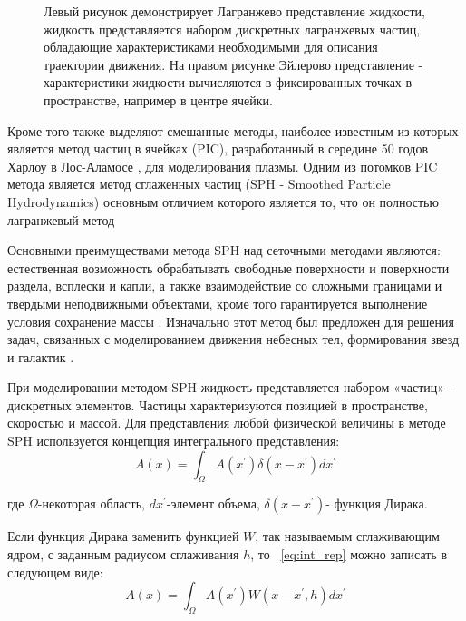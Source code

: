 \begin{figure}[ht]
  \caption{Левый рисунок демонстрирует Лагранжево представление жидкости, жидкость представляется набором дискретных лагранжевых частиц, обладающие характеристиками необходимыми для описания траектории движения. На правом рисунке Эйлерово представление - характеристики жидкости вычисляются в фиксированных точках в пространстве, например в центре ячейки.}\label{fig:sim_class}
\end{figure}

Кроме того также выделяют смешанные методы, наиболее известным из которых является метод частиц в ячейках (PIC), разработанный в середине 50 годов Харлоу в Лос-Аламосе \cite {Harlow1963, Belocherkovsky1982, Grigoriev2000}, для моделирования плазмы. Одним из потомков PIC метода является метод сглаженных частиц (SPH - Smoothed Particle Hydrodynamics) основным отличием которого является то, что он полностью лагранжевый метод \cite{Gingold1977, Lucy1977}

Основными преимуществами метода SPH над сеточными методами являются: естественная возможность обрабатывать свободные поверхности и поверхности раздела, всплески и капли, а также взаимодействие со сложными границами и твердыми неподвижными объектами, кроме того гарантируется выполнение условия сохранение массы \cite {Müller2003, Müller2005, Keiser2005, Solenthaler2007, Solenthaler2008, Becker2007}. Изначально этот метод был предложен для решения задач, связанных с моделированием движения небесных тел, формирования звезд и галактик \cite{Gingold1977, Lucy1977}.

При моделировании методом SPH жидкость представляется набором «частиц» - дискретных элементов. Частицы характеризуются позицией в пространстве, скоростью и массой. Для представления любой физической величины  в методе SPH используется концепция интегрального представления:
\begin{equation}
  \label{eq:int_rep}
  A(x) = \int_{\Omega}A(x^{'})\delta (x-x^{'})dx^{'}
\end{equation}

где \(\Omega\)-некоторая область, \(dx^{'}\)-элемент объема, \(\delta (x-x^{'})\)- функция Дирака.

Если функция Дирака заменить функцией \(W\), так называемым сглаживающим ядром, с заданным радиусом сглаживания \(h\), то ~\ref{eq:int_rep} можно записать в следующем виде:
\[
  A(x) = \int_{\Omega}A(x^{'})W(x-x^{'}, h)dx^{'}
\]

